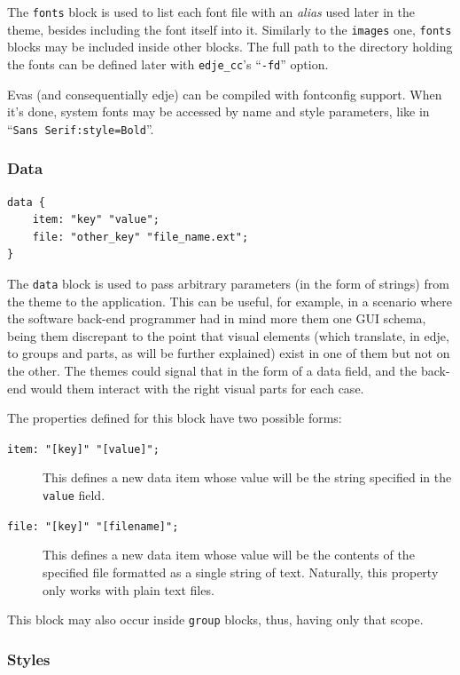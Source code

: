 \documentclass[a4paper]{profusion}
\begin{document}
The \texttt{fonts} block is used to list each font file with an
\emph{alias} used later in the theme, besides including the font
itself into it. Similarly to the \texttt{images} one, \texttt{fonts}
blocks may be included inside other blocks. The full path to the
directory holding the fonts can be defined later with
\texttt{edje\_cc}'s ``\texttt{-fd}'' option.

Evas (and consequentially edje) can be compiled with fontconfig
support.  When it's done, system fonts may be accessed by name and
style parameters, like in ``\texttt{Sans Serif:style=Bold}''.

\subsubsection{Data}

\begin{lstlisting}
data {
    item: "key" "value";
    file: "other_key" "file_name.ext";
}
\end{lstlisting}

The \texttt{data} block is used to pass arbitrary parameters (in the
form of strings) from the theme to the application.  This can be
useful, for example, in a scenario where the software back-end
programmer had in mind more them one GUI schema, being them discrepant
to the point that visual elements (which translate, in edje, to groups
and parts, as will be further explained) exist in one of them but not
on the other. The themes could signal that in the form of a data
field, and the back-end would them interact with the right visual
parts for each case.

The properties defined for this block have two possible forms:
\begin{description}
\item[\texttt{item: "[key]" "[value]";}] This defines a new data item
  whose value will be the string specified in the \texttt{value}
  field.
\item[\texttt{file: "[key]" "[filename]";}] This defines a new data
  item whose value will be the contents of the specified file formatted
  as a single string of text. Naturally, this property only works with
  plain text files.
\end{description}

This block  may also occur inside  \texttt{group} blocks, thus,
having only that scope.

\subsubsection{Styles}
\end{document}
